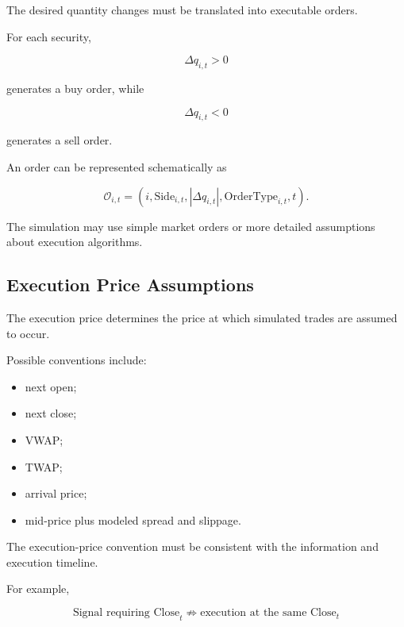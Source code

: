 \documentclass[11pt,a4paper]{article}
\begin{document}
The desired quantity changes must be translated into executable orders.

For each security,

\begin{equation}
\Delta q_{i,t}>0
\end{equation}

generates a buy order, while

\begin{equation}
\Delta q_{i,t}<0
\end{equation}

generates a sell order.

An order can be represented schematically as

\begin{equation}
\boxed{
\mathcal{O}_{i,t}
=
\left(
i,
\mathrm{Side}_{i,t},
|\Delta q_{i,t}|,
\mathrm{OrderType}_{i,t},
t
\right).
}
\end{equation}

The simulation may use simple market orders or more detailed assumptions about
execution algorithms.


\subsection{Execution Price Assumptions}

The execution price determines the price at which simulated trades are assumed
to occur.

Possible conventions include:

\begin{itemize}
    \item next open;
    \item next close;
    \item VWAP;
    \item TWAP;
    \item arrival price;
    \item mid-price plus modeled spread and slippage.
\end{itemize}

The execution-price convention must be consistent with the information and
execution timeline.

For example,

\begin{equation}
\boxed{
\text{Signal requiring Close}_t
\not\Rightarrow
\text{execution at the same Close}_t
}
\end{equation}
\end{document}
